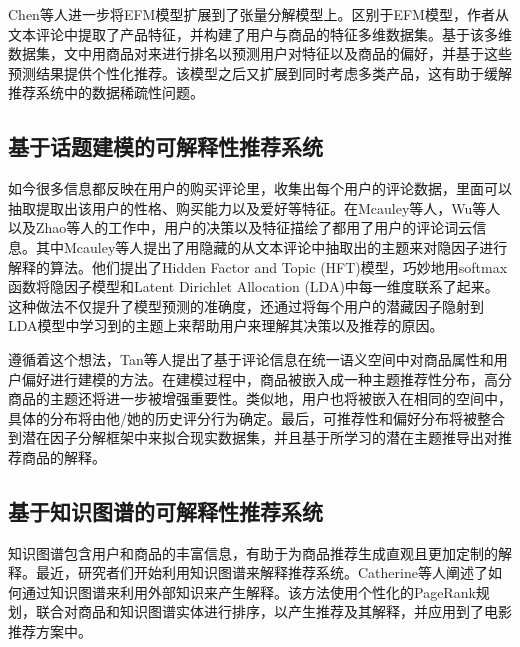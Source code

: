 
Chen等人进一步将EFM模型扩展到了张量分解模型上。区别于EFM模型，作者从文本评论中提取了产品特征，并构建了用户与商品的特征多维数据集。基于该多维数据集，文中用商品对来进行排名以预测用户对特征以及商品的偏好，并基于这些预测结果提供个性化推荐。该模型之后又扩展到同时考虑多类产品，这有助于缓解推荐系统中的数据稀疏性问题。

\subsection{基于话题建模的可解释性推荐系统}
如今很多信息都反映在用户的购买评论里，收集出每个用户的评论数据，里面可以抽取提取出该用户的性格、购买能力以及爱好等特征。在Mcauley等人，Wu等人以及Zhao等人的工作中，用户的决策以及特征描绘了都用了用户的评论词云信息。其中Mcauley等人提出了用隐藏的从文本评论中抽取出的主题来对隐因子进行解释的算法。他们提出了Hidden Factor and Topic (HFT)模型，巧妙地用softmax函数将隐因子模型和Latent Dirichlet Allocation (LDA)中每一维度联系了起来。这种做法不仅提升了模型预测的准确度，还通过将每个用户的潜藏因子隐射到LDA模型中学习到的主题上来帮助用户来理解其决策以及推荐的原因。

遵循着这个想法，Tan等人提出了基于评论信息在统一语义空间中对商品属性和用户偏好进行建模的方法。在建模过程中，商品被嵌入成一种主题推荐性分布，高分商品的主题还将进一步被增强重要性。类似地，用户也将被嵌入在相同的空间中，具体的分布将由他/她的历史评分行为确定。最后，可推荐性和偏好分布将被整合到潜在因子分解框架中来拟合现实数据集，并且基于所学习的潜在主题推导出对推荐商品的解释。

\subsection{基于知识图谱的可解释性推荐系统}
知识图谱包含用户和商品的丰富信息，有助于为商品推荐生成直观且更加定制的解释。最近，研究者们开始利用知识图谱来解释推荐系统。Catherine等人阐述了如何通过知识图谱来利用外部知识来产生解释。该方法使用个性化的PageRank规划，联合对商品和知识图谱实体进行排序，以产生推荐及其解释，并应用到了电影推荐方案中。

